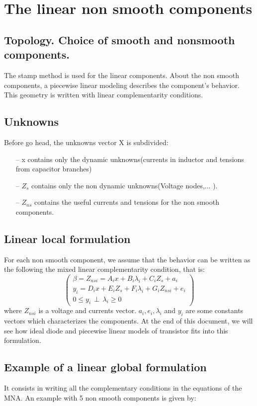 


\section{The linear non smooth components}
\subsection{Topology. Choice of smooth and nonsmooth components.}
The stamp method is used for the linear components. About the non smooth components, a piecewise
linear modeling describes the component's behavior. This geometry is written with linear
complementarity conditions. 
\subsection{Unknowns}
Before go head, the unknowns vector X is subdivided:
\begin{enumerate}
\item[--] x contains only the dynamic unknowns(currents in inductor and tensions from capacitor branches)
\item[--] $Z_{s}$ contains only the non dynamic unknowns(Voltage nodes,... ).
\item[--] $Z_{ns}$ contains the useful currents and tensions for the non smooth components.
\end{enumerate}
\subsection{Linear local formulation}
For each non smooth component, we assume that the behavior can be written as the following the mixed linear  complementarity condition, that is:
\begin{equation}\left(\begin{array}{c}
\beta = Z_{nsi} = A_{i}x+B_{i}\lambda_{i}+C_{i}Z_{s} + a_{i}\\
y_{i}=D_{i}x+E_{i}Z_{s}+F_{i}\lambda_{i}+G_{i}Z_{nsi}+e_{i}\\
0 \leq y_{i} \, \perp \, \lambda_{i} \geq 0
\end{array}\right)
\end{equation}
where $Z_{nsi}$ is a voltage and currents vector. $a_{i},e_{i},\lambda_{i}$ and $y_{i}$ are some constants vectors which characterizes the components. At the end
of this document, we will see how ideal diode and piecewise linear models of transistor fits into this formulation.


\subsection{Example of a linear global formulation}
It consists in writing all the complementary conditions in the equations of the MNA. An example with 5 non smooth components is given by:


